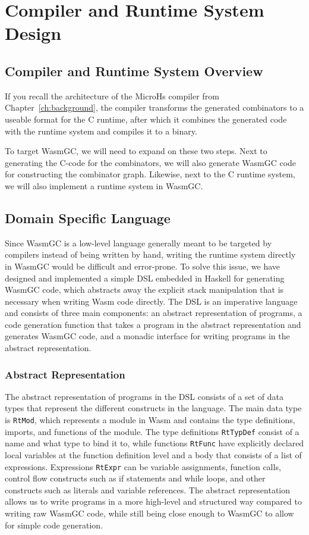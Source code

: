 \chapter{Compiler and Runtime System Design}\label{ch:runtime}
\section{Compiler and Runtime System Overview}
If you recall the architecture of the MicroHs compiler from Chapter~\ref{ch:background}, the compiler transforms the generated combinators to a useable format for the C runtime, after which it combines the generated code with the runtime system and compiles it to a binary. 

To target WasmGC, we will need to expand on these two steps. Next to generating the C-code for the combinators, we will also generate WasmGC code for constructing the combinator graph. Likewise, next to the C runtime system, we will also implement a runtime system in WasmGC.


\section{Domain Specific Language}
Since WasmGC is a low-level language generally meant to be targeted by compilers instead of being written by hand, writing the runtime system directly in WasmGC would be difficult and error-prone. To solve this issue, we have designed and implemented a simple DSL embedded in Haskell for generating WasmGC code, which abstracts away the explicit stack manipulation that is necessary when writing Wasm code directly. The DSL is an imperative language and consists of three main components: an abstract representation of programs, a code generation function that takes a program in the abstract representation and generates WasmGC code, and a monadic interface for writing programs in the abstract representation.

\subsection{Abstract Representation} 
The abstract representation of programs in the DSL consists of a set of data types that represent the different constructs in the language. The main data type is \texttt{RtMod}, which represents a module in Wasm and contains the type definitions, imports, and functions of the module. The type definitions \texttt{RtTypDef} consist of a name and what type to bind it to, while functions \texttt{RtFunc} have explicitly declared local variables at the function definition level and a body that consists of a list of expressions. Expressions \texttt{RtExpr} can be variable assignments, function calls, control flow constructs such as if statements and while loops, and other constructs such as literals and variable references. The abstract representation allows us to write programs in a more high-level and structured way compared to writing raw WasmGC code, while still being close enough to WasmGC to allow for simple code generation.

